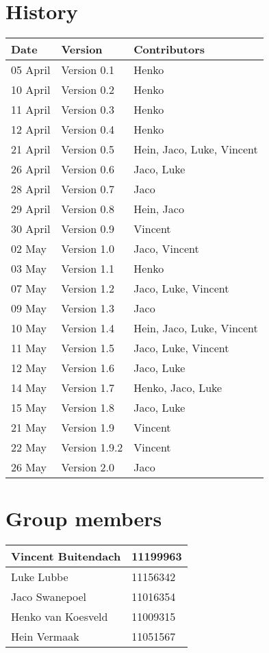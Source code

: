 
\section*{History}
\begin{center}
\begin{tabular}{|l|l|l|}
\hline
\textbf{Date} & \textbf{Version} & \textbf{Contributors}\\
\hline
05 April & Version 0.1 & Henko\\
\hline
10 April & Version 0.2 & Henko\\
\hline
11 April & Version 0.3 & Henko\\
\hline
12 April & Version 0.4 & Henko\\
\hline
21 April & Version 0.5 & Hein, Jaco, Luke, Vincent\\
\hline
26 April & Version 0.6 & Jaco, Luke\\
\hline
28 April & Version 0.7 & Jaco\\
\hline
29 April & Version 0.8 & Hein, Jaco\\
\hline
30 April & Version 0.9 & Vincent\\
\hline
02 May & Version 1.0 & Jaco, Vincent\\
\hline
03 May & Version 1.1 & Henko\\
\hline
07 May & Version 1.2 & Jaco, Luke, Vincent\\
\hline
09 May & Version 1.3 & Jaco\\
\hline
10 May & Version 1.4 & Hein, Jaco, Luke, Vincent\\
\hline
11 May & Version 1.5 & Jaco, Luke, Vincent\\
\hline
12 May & Version 1.6 & Jaco, Luke\\
\hline
14 May & Version 1.7 & Henko, Jaco, Luke\\
\hline
15 May & Version 1.8 & Jaco, Luke\\
\hline
21 May & Version 1.9 & Vincent\\
\hline
22 May & Version 1.9.2 & Vincent\\
\hline
26 May & Version 2.0 & Jaco\\
\hline
\end{tabular}

\vfill
\section*{Group members}

\begin{tabular}{|l|l|}

\hline
Vincent Buitendach & 11199963\\
\hline
Luke Lubbe & 11156342\\
\hline
Jaco Swanepoel & 11016354\\
\hline
Henko van Koesveld & 11009315\\
\hline
Hein Vermaak & 11051567\\
\hline

\end{tabular}

\end{center}

